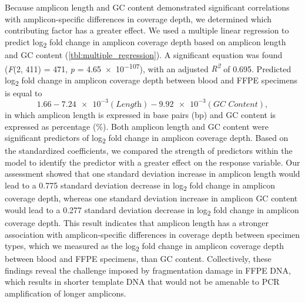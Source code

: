 Because amplicon length and GC content demonstrated significant correlations with amplicon-specific differences in coverage depth, we determined which contributing factor has a greater effect. We used a multiple linear regression to predict log\textsubscript{2} fold change in amplicon coverage depth based on amplicon length and GC content (\autoref{tbl:multiple_regression}). A significant equation was found (\textit{F}(2, 411) = 471, \textit{p} = \num{4.65e-107}), with an adjusted \textit{R\textsuperscript{2}} of 0.695. Predicted log\textsubscript{2} fold change in amplicon coverage depth between blood and FFPE specimens is equal to $$1.66 - \num{7.24e-3}(\textit{Length}) - \num{9.92e-3}(\textit{GC Content}),$$ in which amplicon length is expressed in base pairs (bp) and GC content is expressed as percentage (\%). Both amplicon length and GC content were significant predictors of log\textsubscript{2} fold change in amplicon coverage depth. Based on the standardized coefficients, we compared the strength of predictors within the model to identify the predictor with a greater effect on the response variable. Our assessment showed that one standard deviation increase in amplicon length would lead to a 0.775 standard deviation decrease in log\textsubscript{2} fold change in amplicon coverage depth, whereas one standard deviation increase in amplicon GC content would lead to a 0.277 standard deviation decrease in log\textsubscript{2} fold change in amplicon coverage depth. This result indicates that amplicon length has a stronger association with amplicon-specific differences in coverage depth between specimen types, which we measured as the log\textsubscript{2} fold change in amplicon coverage depth between blood and FFPE specimens, than GC content. Collectively, these findings reveal the challenge imposed by fragmentation damage in FFPE DNA, which results in shorter template DNA that would not be amenable to PCR amplification of longer amplicons.


